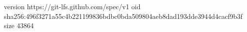 version https://git-lfs.github.com/spec/v1
oid sha256:496f3271a55c4b221199836bdbc0bda509804aeb8dad193dde3944d4cacf9b3f
size 43864
